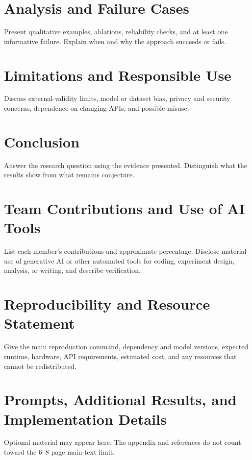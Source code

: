 \documentclass[10pt]{article}
\begin{document}
\section{Analysis and Failure Cases}
Present qualitative examples, ablations, reliability checks, and at least one informative failure. Explain when and why the approach succeeds or fails.

\section{Limitations and Responsible Use}
Discuss external-validity limits, model or dataset bias, privacy and security concerns, dependence on changing APIs, and possible misuse.

\section{Conclusion}
Answer the research question using the evidence presented. Distinguish what the results show from what remains conjecture.

\section*{Team Contributions and Use of AI Tools}
List each member's contributions and approximate percentage. Disclose material use of generative AI or other automated tools for coding, experiment design, analysis, or writing, and describe verification.

\section*{Reproducibility and Resource Statement}
Give the main reproduction command, dependency and model versions, expected runtime, hardware, API requirements, estimated cost, and any resources that cannot be redistributed.




\appendix
\section{Prompts, Additional Results, and Implementation Details}
Optional material may appear here. The appendix and references do not count toward the 6--8 page main-text limit.
\end{document}
